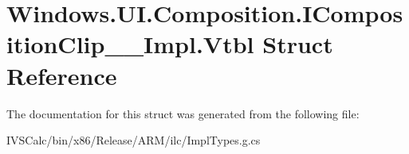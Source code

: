 \hypertarget{struct_windows_1_1_u_i_1_1_composition_1_1_i_composition_clip_____impl_1_1_vtbl}{}\section{Windows.\+U\+I.\+Composition.\+I\+Composition\+Clip\+\_\+\+\_\+\+Impl.\+Vtbl Struct Reference}
\label{struct_windows_1_1_u_i_1_1_composition_1_1_i_composition_clip_____impl_1_1_vtbl}


The documentation for this struct was generated from the following file\+:\begin{DoxyCompactItemize}
\item 
I\+V\+S\+Calc/bin/x86/\+Release/\+A\+R\+M/ilc/Impl\+Types.\+g.\+cs\end{DoxyCompactItemize}
